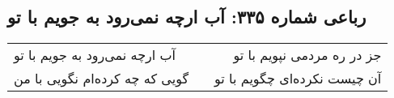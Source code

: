 \begin{center}
\section*{رباعی شماره ۳۳۵: آب ارچه نمی‌رود به جویم با تو}
\label{sec:sh335}
\begin{longtable}{l p{0.5cm} r}
آب ارچه نمی‌رود به جویم با تو
&&
جز در ره مردمی نپویم با تو
\\
گویی که چه کرده‌ام نگویی با من
&&
آن چیست نکرده‌ای چگویم با تو
\\
\end{longtable}
\end{center}
